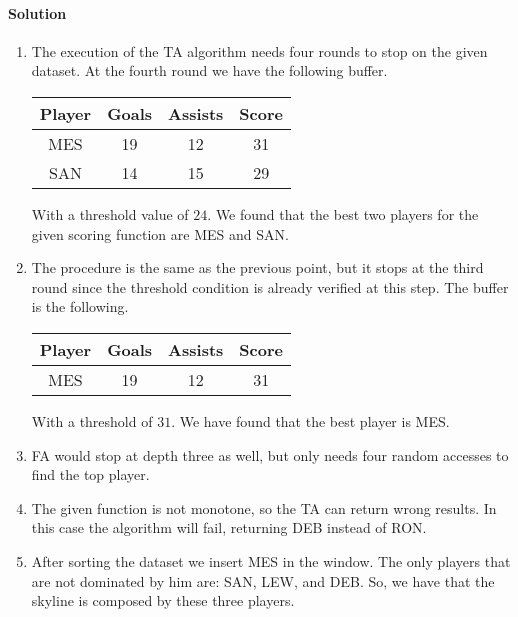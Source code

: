 \paragraph*{Solution}
\begin{enumerate}
    \item The execution of the TA algorithm needs four rounds to stop on the given dataset. At the fourth 
        round we have the following buffer. 
        \begin{table}[H]
            \centering
            \begin{tabular}{c|cc|c}
            \hline
            \textbf{Player} & \textbf{Goals} & \textbf{Assists} & \textbf{Score} \\ \hline
            MES             & 19             & 12               & 31             \\
            SAN             & 14             & 15               & 29             \\ \hline
            \end{tabular}
        \end{table}
        With a threshold value of $24$. We found that the best two players for the given scoring function
        are MES and SAN. 
    \item The procedure is the same as the previous point, but it stops at the third round since the threshold 
        condition is already verified at this step. The buffer is the following.
        \begin{table}[H]
            \centering
            \begin{tabular}{c|cc|c}
            \hline
            \textbf{Player} & \textbf{Goals} & \textbf{Assists} & \textbf{Score} \\ \hline
            MES             & 19             & 12               & 31             \\ \hline
            \end{tabular}
        \end{table}
        With a threshold of $31$. We have found that the best player is MES. 
    \item FA would stop at depth three as well, but only needs four random accesses to find the top player. 
    \item The given function is not monotone, so the TA can return wrong results. In this case the algorithm 
        will fail, returning DEB instead of RON. 
    \item After sorting the dataset we insert MES in the window. The only players that are not dominated by him
        are: SAN, LEW, and DEB. So, we have that the skyline is composed by these three players. 
\end{enumerate}